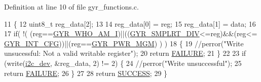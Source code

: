 Definition at line 10 of file gyr\-\_\-functions.\-c.


\begin{DoxyCode}
11 \{
12   uint8\_t reg\_data[2];
13 
14   reg\_data[0] = reg;
15   reg\_data[1] = data;
16 
17   \textcolor{keywordflow}{if}( !( (reg==\hyperlink{communication_2imu__regs_8h_ab2499ff4167376accdbdec09f5e1b021}{GYR\_WHO\_AM\_I})||((\hyperlink{communication_2imu__regs_8h_a04a18568e6e39825c98be5ec2976bec4}{GYR\_SMPLRT\_DIV}<=reg)&&(reg<=
      \hyperlink{communication_2imu__regs_8h_ad0b8386ab023e17beb305025abf96e18}{GYR\_INT\_CFG}))||(reg==\hyperlink{communication_2imu__regs_8h_a5eba4af610a1ec85320e940bf44855eb}{GYR\_PWR\_MGM}) ) )
18   \{
19       \textcolor{comment}{//perror("Write unsucessful: Not a valid writable register");}
20       \textcolor{keywordflow}{return} \hyperlink{calibration_2calibration_8h_a6d58f9ac447476b4e084d7ca383f5183}{FAILURE};
21   \}
22         
23   \textcolor{keywordflow}{if} (write(\hyperlink{CommunicationV0_2communication_8c_a7751bd45ac1064efb35adf1f19c25db8}{i2c\_dev}, &reg\_data, 2) != 2) \{                
24           \textcolor{comment}{//perror("Write unsuccessful");}
25           \textcolor{keywordflow}{return} \hyperlink{calibration_2calibration_8h_a6d58f9ac447476b4e084d7ca383f5183}{FAILURE};
26   \}
27 
28   \textcolor{keywordflow}{return} \hyperlink{calibration_2calibration_8h_aa90cac659d18e8ef6294c7ae337f6b58}{SUCCESS};
29 \}
\end{DoxyCode}
